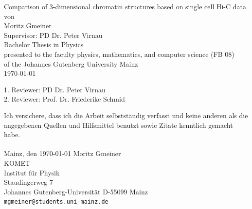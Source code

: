 \documentclass[a4paper,11pt,oneside,final,english,toc=bib,draft]{scrbook}
\begin{document}

\begin{titlepage}
  \vspace*{6mm}
  \begin{center}
     {\afont Comparison of 3-dimensional chromatin structures based on single cell Hi-C data}
     \\[3.5cm]
     {\large von}
     \\[3.5cm]
     {\dfont Moritz Gmeiner}
     \\[1.5cm]
     {\dfont Supervisor: PD Dr. Peter Virnau}
     \\[2cm]
     {\large Bachelor Thesis in Physics \/\\
        presented to the faculty physics, mathematics, and computer science (FB 08) \/\\
        of the Johannes Gutenberg University Mainz \/\\
        \today}
   \end{center}
   \vfill
   1. Reviewer: PD Dr. Peter Virnau \\	
   2. Reviewer: Prof. Dr. Friederike Schmid \\
   \vfill
\end{titlepage}

\thispagestyle{empty}
Ich versichere, dass ich die Arbeit selbstständig verfasst und keine 
anderen als die angegebenen Quellen und Hilfsmittel benutzt sowie 
Zitate kenntlich gemacht habe.
\\
\\[3.5cm] 
Mainz, den \today
\vfill
\noindent 
Moritz Gmeiner\\
KOMET\\
Institut für Physik\\
Staudingerweg 7\\
Johannes Gutenberg-Universität
D-55099 Mainz\\
{ \texttt{mgmeiner@students.uni-mainz.de} }

\end{document}
